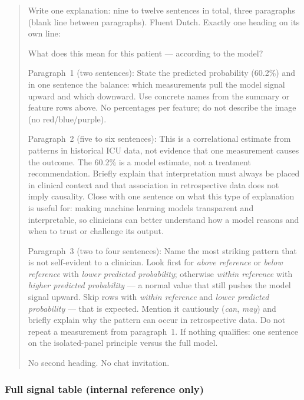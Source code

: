 \documentclass[12pt, a4paper]{article}
\begin{document}
\begin{quote}
Write one explanation: nine to twelve sentences in total, three paragraphs
(blank line between paragraphs). Fluent Dutch. Exactly one heading on its own line:

What does this mean for this patient --- according to the model?

Paragraph~1 (two sentences): State the predicted probability (60.2\%) and in
one sentence the balance: which measurements pull the model signal upward and
which downward. Use concrete names from the summary or feature rows above. No
percentages per feature; do not describe the image (no red/blue/purple).

Paragraph~2 (five to six sentences): This is a correlational estimate from
patterns in historical ICU data, not evidence that one measurement causes the
outcome. The 60.2\% is a model estimate, not a treatment recommendation. Briefly
explain that interpretation must always be placed in clinical context and that
association in retrospective data does not imply causality. Close with one
sentence on what this type of explanation is useful for: making machine learning
models transparent and interpretable, so clinicians can better understand how
a model reasons and when to trust or challenge its output.

Paragraph~3 (two to four sentences): Name the most striking pattern that is not
self-evident to a clinician. Look first for \textit{above reference} or
\textit{below reference} with \textit{lower predicted probability}; otherwise
\textit{within reference} with \textit{higher predicted probability} --- a
normal value that still pushes the model signal upward. Skip rows with
\textit{within reference} and \textit{lower predicted probability} --- that is
expected. Mention it cautiously (\textit{can}, \textit{may}) and briefly explain
why the pattern can occur in retrospective data. Do not repeat a measurement
from paragraph~1. If nothing qualifies: one sentence on the isolated-panel
principle versus the full model.

No second heading. No chat invitation.
\end{quote}

\subsubsection*{Full signal table (internal reference only)}
\end{document}
